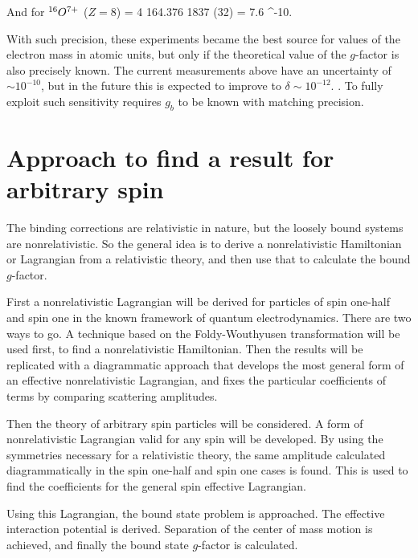 And for $^{16}O^{7+}$ ($Z=8$)
\beq
		  = \num{4 164.376 1837 (32)} \hspace{3em} \delta= 7.6 ^{-10}.
\eeq

With such precision, these experiments became the best source for values of the electron mass in atomic units, but only if the theoretical value of the $g$-factor is also precisely known.  The current measurements above have an uncertainty of $ \sim 10^{-10}$, but in the future this is expected to improve to $\delta \sim 10^{-12}$. \cite{Jentschura2006102,Quint:2008}.  To fully exploit such sensitivity requires $g_b$ to be known with matching precision.  



\section{Approach to find a result for arbitrary spin}
The binding corrections are relativistic in nature, but the loosely bound systems are nonrelativistic.  So the general idea is to derive a nonrelativistic Hamiltonian or Lagrangian from a relativistic theory, and then use that to calculate the bound $g$-factor.

First a nonrelativistic Lagrangian will be derived for particles of spin one-half and spin one in the known framework of quantum electrodynamics.  There are two ways to go.  A technique based on the Foldy-Wouthyusen transformation will be used first, to find a nonrelativistic Hamiltonian.  Then the results will be replicated with a diagrammatic approach that develops the most general form of an effective nonrelativistic Lagrangian, and fixes the particular coefficients of terms by comparing scattering amplitudes.

Then the theory of arbitrary spin particles will be considered.  A form of nonrelativistic Lagrangian valid for any spin will be developed.  By using the symmetries necessary for a relativistic theory, the same amplitude calculated diagrammatically in the spin one-half and spin one cases is found.  This is used to find the coefficients for the general spin effective Lagrangian.

Using this Lagrangian, the bound state problem is approached.  The effective interaction potential is derived.  Separation of the center of mass motion is achieved, and finally the bound state $g$-factor is calculated.




